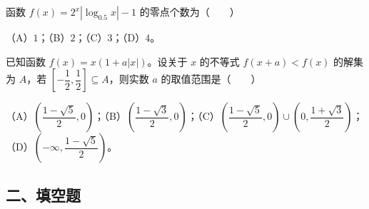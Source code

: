 \begin{question}
函数 $f(x)=2^x|\log_{0.5}x|-1$ 的零点个数为\mbox{（　　）}

（A）$1$；（B）$2$；（C）$3$；（D）$4$。

\end{question}
\begin{question}
已知函数 $f(x)=x(1+a|x|)$。设关于 $x$ 的不等式 $f(x+a)<f(x)$ 的解集为 $A$，若 $\left[-\dfrac12,\dfrac12\right]\subseteq A$，则实数 $a$ 的取值范围是\mbox{（　　）}

（A）$\left(\dfrac{1-\sqrt5}{2},0\right)$；（B）$\left(\dfrac{1-\sqrt3}{2},0\right)$；（C）$\left(\dfrac{1-\sqrt5}{2},0\right)\cup\left(0,\dfrac{1+\sqrt3}{2}\right)$；（D）$\left(-\infty,\dfrac{1-\sqrt5}{2}\right)$。

\end{question}
\begingroup
\renewcommand{\gkpart}[1]{\Needspace{0.4\textheight}\subsection*{#1}\nopagebreak}
\gkpart{二、填空题}
\endgroup

